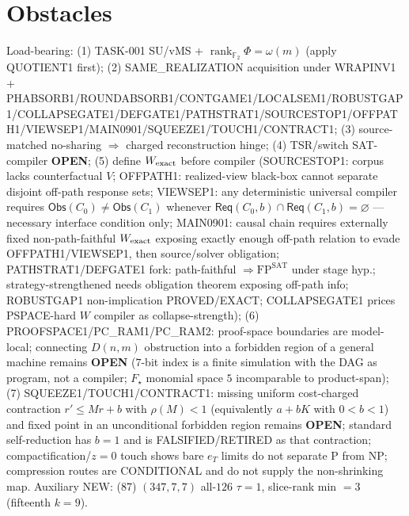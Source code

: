 \documentclass[11pt]{article}
\begin{document}
\section*{Obstacles}
Load-bearing: (1) TASK-001 SU/vMS + $\operatorname{rank}_{\mathbb F_2}\Phi=\omega(m)$ (apply QUOTIENT1 first);
(2) SAME\_REALIZATION acquisition under WRAPINV1 + PHABSORB1/ROUNDABSORB1/CONTGAME1/LOCALSEM1/ROBUSTGAP1/COLLAPSEGATE1/DEFGATE1/PATHSTRAT1/SOURCESTOP1/OFFPATH1/VIEWSEP1/MAIN0901/SQUEEZE1/TOUCH1/CONTRACT1;
(3) source-matched no-sharing $\Rightarrow$ charged reconstruction hinge;
(4) TSR/switch SAT-compiler \textbf{OPEN};
(5) define $W_{\rm exact}$ before compiler (SOURCESTOP1: corpus lacks counterfactual $V$;
OFFPATH1: realized-view black-box cannot separate disjoint off-path response sets;
VIEWSEP1: any deterministic universal compiler requires $\mathsf{Obs}(C_0)\ne\mathsf{Obs}(C_1)$
whenever $\mathsf{Req}(C_0,b)\cap\mathsf{Req}(C_1,b)=\varnothing$ --- necessary interface condition only;
MAIN0901: causal chain requires externally fixed non-path-faithful $W_{\rm exact}$ exposing
exactly enough off-path relation to evade OFFPATH1/VIEWSEP1, then source/solver obligation;
PATHSTRAT1/DEFGATE1 fork: path-faithful $\Rightarrow\mathrm{FP}^{\mathrm{SAT}}$ under stage hyp.;
strategy-strengthened needs obligation theorem exposing off-path info;
ROBUSTGAP1 non-implication PROVED/EXACT; COLLAPSEGATE1 prices PSPACE-hard $W$ compiler as collapse-strength);
(6) PROOFSPACE1/PC\_RAM1/PC\_RAM2: proof-space boundaries are model-local; connecting $D(n,m)$ obstruction into a
forbidden region of a general machine remains \textbf{OPEN} ($7$-bit index is a finite simulation with the DAG as program, not a compiler; $F_\star$ monomial space $5$ incomparable to product-span);
(7) SQUEEZE1/TOUCH1/CONTRACT1: missing uniform cost-charged contraction $r'\le Mr+b$ with $\rho(M){\lt}1$ (equivalently $a+bK$ with $0{<}b{<}1$) and fixed point in an unconditional forbidden region remains \textbf{OPEN};
standard self-reduction has $b{=}1$ and is FALSIFIED/RETIRED as that contraction; compactification/$z{=}0$ touch shows bare $e_T$ limits do not separate P from NP;
compression routes are CONDITIONAL and do not supply the non-shrinking map.
Auxiliary NEW: (87) $(347,7,7)$ all-$126$ $\tau{=}1$, slice-rank min $=3$ (fifteenth $k{=}9$).
\end{document}
